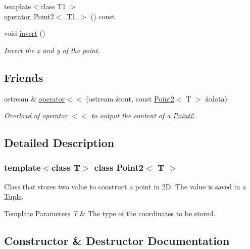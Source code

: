 \begin{DoxyCompactItemize}
\item 
{\footnotesize template$<$class T1 $>$ }\\\mbox{\hyperlink{class_point2_a3af3e22d9650f7bde9dd9deeb043dffa}{operator Point2$<$ T1 $>$}} () const
\item 
void \mbox{\hyperlink{class_point2_aabc6ec4c0ed4c7757ac61a9448195c97}{invert}} ()
\begin{DoxyCompactList}\small\item\em Invert the x and y of the point. \end{DoxyCompactList}\end{DoxyCompactItemize}
\subsection*{Friends}
\begin{DoxyCompactItemize}
\item 
ostream \& \mbox{\hyperlink{class_point2_a9156326af6248209210a7bd67569e5c2}{operator$<$$<$}} (ostream \&out, const \mbox{\hyperlink{class_point2}{Point2}}$<$ T $>$ \&data)
\begin{DoxyCompactList}\small\item\em Overload of operator $<$$<$ to output the content of a {\ttfamily \mbox{\hyperlink{class_point2}{Point2}}}. \end{DoxyCompactList}\end{DoxyCompactItemize}


\subsection{Detailed Description}
\subsubsection*{template$<$class T$>$\newline
class Point2$<$ T $>$}

Class that stores two value to construct a point in 2D. The value is saved in a \mbox{\hyperlink{class_tuple}{Tuple}}. 


\begin{DoxyTemplParams}{Template Parameters}
{\em T} & The type of the coordinates to be stored. \\
\hline
\end{DoxyTemplParams}


\subsection{Constructor \& Destructor Documentation}
\mbox{\label{class_point2_a4674f9e2fab693fc83afd5af234100d3}} 
